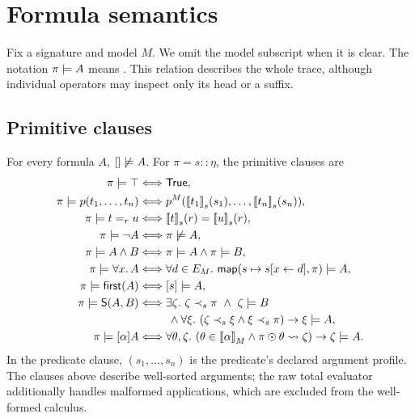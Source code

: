 \section{Formula semantics}\label{sec:semantics}

Fix a signature and model $M$. We omit the model subscript when it is clear.
The notation $\pi\models A$ means . This relation
describes the whole trace, although individual operators may inspect only
its head or a suffix.

\subsection{Primitive clauses}
\begin{definition}
For every formula $A$, $[]\not\models A$. For $\pi=s::\eta$, the primitive clauses are
\begin{align*}
 \pi\sat\top&\Longleftrightarrow\mathsf{True},\\
 \pi\sat p(t_1,\ldots,t_n)
   &\Longleftrightarrow p^M(\eval{t_1}{s}(s_1),\ldots,\eval{t_n}{s}(s_n)),\\
 \pi\sat t=_r u&\Longleftrightarrow\eval{t}{s}(r)=\eval{u}{s}(r),\\
 \pi\sat\neg A&\Longleftrightarrow\pi\nsat A,\\
 \pi\sat A\land B&\Longleftrightarrow\pi\sat A\land\pi\sat B,\\
 \pi\sat\forall x.\,A&\Longleftrightarrow
    \forall d\in E_M.\ \mathsf{map}(s\mapsto s[x\leftarrow d],\pi)\sat A,\\
 \pi\sat\Fst{A}&\Longleftrightarrow[s]\sat A,\\
 \pi\sat\Suf{A}{B}&\Longleftrightarrow
    \exists\zeta.\ \zeta\psuf\pi\ \land\ \zeta\sat B\\
    &\hspace{2.6em}{}\land\forall\xi.\
      (\zeta\psuf\xi\land\xi\psuf\pi)\to\xi\sat A,\\
 \pi\sat\BoxP{\alpha}{A}&\Longleftrightarrow
    \forall\theta,\zeta.\
      (\theta\in\interp{\alpha}_M\land\pi\odot\theta\leadsto\zeta)
      \to\zeta\sat A.
\end{align*}
In the predicate clause, $(s_1,\ldots,s_n)$ is the predicate's declared
argument profile. The clauses above describe well-sorted arguments; the raw
total evaluator additionally handles malformed applications, which are excluded
from the well-formed calculus.
\end{definition}

